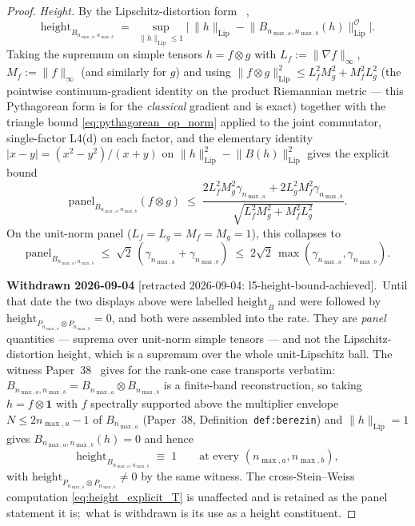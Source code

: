 \documentclass[11pt,a4paper]{article}
\theoremstyle{plain}
\theoremstyle{definition}
\newcommand{\nmaxa}{n_{\max,a}}
\newcommand{\nmaxb}{n_{\max,b}}
\newcommand{\Op}{\mathcal{O}}
\newcommand{\Lipnorm}[1]{\lVert #1 \rVert_{\mathrm{Lip}}}
\newcommand{\norm}[1]{\lVert #1 \rVert}
\begin{document}
\begin{proof}
\emph{Height.} By the Lipschitz-distortion form
\cite[\S 4]{latremoliere_metric_st_2017}~\cite[Remark~3.8]{loutey_paper38},
\begin{equation*}
   \mathrm{height}_{B_{\nmaxa, \nmaxb}}
   \;=\; \sup_{\norm{h}_{\mathrm{Lip}} \le 1}
         \bigl|\,\norm{h}_{\mathrm{Lip}}
              - \norm{B_{\nmaxa, \nmaxb}(h)}_{\mathrm{Lip}}^{\Op}\bigr|.
\end{equation*}
Taking the supremum on simple tensors $h = f \otimes g$ with
$L_f := \norm{\nabla f}_\infty$, $M_f := \norm{f}_\infty$ (and
similarly for $g$) and using
$\norm{f \otimes g}_{\mathrm{Lip}}^2 \le L_f^2 M_g^2 + M_f^2 L_g^2$
(the pointwise continuum-gradient identity on the product Riemannian
metric --- this Pythagorean form is for the \emph{classical} gradient
and is exact) together with the triangle bound
\eqref{eq:pythagorean_op_norm} applied to the
joint commutator, single-factor L4(d) on each factor, and the
elementary identity $|x - y| = (x^2 - y^2)/(x + y)$ on
$\norm{h}_{\mathrm{Lip}}^2 - \norm{B(h)}_{\mathrm{Lip}}^2$ gives the
explicit bound
\begin{equation}\label{eq:height_explicit_T}
   \mathrm{panel}_{B_{\nmaxa, \nmaxb}}(f \otimes g)
   \;\le\; \frac{2 L_f^2 M_g^2 \gamma_{\nmaxa}
                 + 2 L_g^2 M_f^2 \gamma_{\nmaxb}}
              {\sqrt{L_f^2 M_g^2 + M_f^2 L_g^2}}.
\end{equation}
On the unit-norm panel ($L_f = L_g = M_f = M_g = 1$), this collapses to
\begin{equation}\label{eq:height_unit_panel}
   \mathrm{panel}_{B_{\nmaxa, \nmaxb}}
   \;\le\; \sqrt{2}\,(\gamma_{\nmaxa} + \gamma_{\nmaxb})
   \;\le\; 2\sqrt{2}\,\max(\gamma_{\nmaxa}, \gamma_{\nmaxb}).
\end{equation}

\textbf{Withdrawn 2026-09-04}
[retracted 2026-09-04: l5-height-bound-achieved].\ Until that date the
two displays above were labelled $\mathrm{height}_{B}$ and were followed
by $\mathrm{height}_{P_{\nmaxa} \otimes P_{\nmaxb}} = 0$, and both were
assembled into the rate. They are \emph{panel} quantities --- suprema over
unit-norm simple tensors --- and not the Lipschitz-distortion height,
which is a supremum over the whole unit-Lipschitz ball. The witness
Paper~38~\cite{loutey_paper38} gives for the rank-one case transports
verbatim:\ $B_{\nmaxa, \nmaxb} = B_{\nmaxa} \otimes B_{\nmaxb}$ is a
finite-band reconstruction, so taking $h = f \otimes \mathbf{1}$ with $f$
spectrally supported above the multiplier envelope $N \le 2\nmaxa - 1$ of
$B_{\nmaxa}$ (Paper~38, Definition~\texttt{def:berezin}) and
$\Lipnorm{h} = 1$ gives
$B_{\nmaxa, \nmaxb}(h) = 0$ and hence
\begin{equation}\label{eq:height_one_T}
   \mathrm{height}_{B_{\nmaxa, \nmaxb}} \;\equiv\; 1
   \qquad\text{at every } (\nmaxa, \nmaxb),
\end{equation}
with $\mathrm{height}_{P_{\nmaxa} \otimes P_{\nmaxb}} \ne 0$ by the same
witness. The cross-Stein--Weiss computation
\eqref{eq:height_explicit_T} is unaffected and is retained as the panel
statement it is;\ what is withdrawn is its use as a height constituent.


\end{proof}
\end{document}
